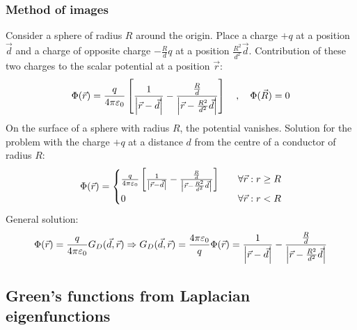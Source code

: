 \subsubsection{Method of images}

Consider a sphere of radius $R$ around the origin. Place a charge $+q$ at
a position $\vec{d}$ and a charge of opposite charge $-\frac{R}{d} q$ at
a position $\frac{R^2}{d^2} \vec{d}$. Contribution of these two charges
to the scalar potential at a position $\vec{r}$:
\begin{align*}
    \Phi(\vec{r}) = \frac{q}{4 \pi \varepsilon_0}
        \left[ \frac{1}{\left\vert \vec{r} - \vec{d} \right\vert}
        - \frac{\frac{R}{d}}{\left\vert \vec{r} - \frac{R^2}{d^2} \vec{d} \right\vert} \right]
    \hspace{10pt} , \hspace{10pt}
    \Phi(\vec{R}) = 0
\end{align*}
On the surface of a sphere with radius $R$, the potential vanishes.
Solution for the problem with the charge $+q$ at a distance $d$ from
the centre of a conductor of radius $R$:
\begin{align*}
    \Phi(\vec{r}) = \begin{cases}
        \frac{q}{4 \pi \varepsilon_0}
        \left[ \frac{1}{\left\vert \vec{r} - \vec{d} \right\vert}
        - \frac{\frac{R}{d}}{\left\vert \vec{r} - \frac{R^2}{d^2} \vec{d} \right\vert} \right]
        \hspace{10pt} &\forall \vec{r} : r \geq R
        \\
        0 \hspace{10pt} &\forall \vec{r} : r < R
    \end{cases}
\end{align*}
General solution:
\begin{align*}
    \Phi(\vec{r}) = \frac{q}{4 \pi \varepsilon_0} G_D (\vec{d},\vec{r})
    \Rightarrow
    G_D (\vec{d},\vec{r}) = \frac{4 \pi \varepsilon_0}{q} \Phi(\vec{r})
    = \frac{1}{\left\vert \vec{r} - \vec{d} \right\vert} - \frac{\frac{R}{d}}{\left\vert \vec{r} - \frac{R^2}{d^2} \vec{d} \right\vert}
\end{align*}

\subsection{Green's functions from Laplacian eigenfunctions}

